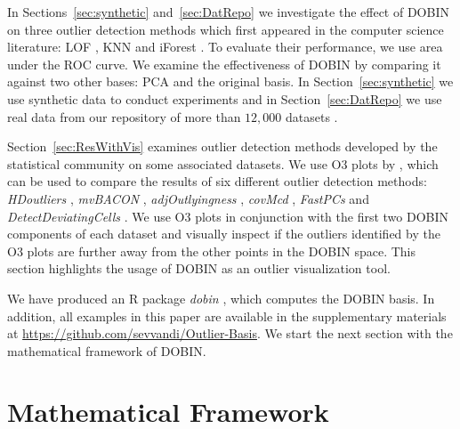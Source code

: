 \documentclass[letter,12pt]{article}
\begin{document}
In Sections~\ref{sec:synthetic} and~\ref{sec:DatRepo} we investigate the effect of DOBIN on three outlier detection methods which first appeared in the computer science literature: LOF \citep{breunig2000lof}, KNN \citep{ramaswamy2000efficient} and iForest \citep{liu2008isolation}. To evaluate their performance, we use area under the ROC curve. We examine the effectiveness of DOBIN by comparing it against two other bases: PCA and the original basis. In Section~\ref{sec:synthetic} we use synthetic data to conduct experiments and in Section~\ref{sec:DatRepo} we use real data from our repository of more than $12,000$ datasets \citep{datasets}.

Section~\ref{sec:ResWithVis} examines outlier detection methods developed by the statistical community on some associated datasets. We use O3 plots by \cite{unwin2019multivariate}, which can be used to compare the results of six different outlier detection methods: \textit{HDoutliers} \citep{wilkinson2017visualizing}, \textit{mvBACON} \citep{billor2000bacon}, \textit{adjOutlyingness} \citep{brys2005robustification}, \textit{covMcd} \citep{rousseeuw1999fast} , \textit{FastPCs} \citep{vakili2014finding} and \textit{DetectDeviatingCells} \citep{rousseeuw2018detecting}. We use O3 plots in conjunction with the first two DOBIN components of each dataset and visually inspect if the outliers identified by the O3 plots are further away from the other points in the DOBIN space. This section highlights the usage of DOBIN as an outlier visualization tool.

We have produced an R package \textit{dobin} \citep{dobin}, which computes the DOBIN basis. In addition, all examples in this paper are available in the supplementary materials at \url{https://github.com/sevvandi/Outlier-Basis}. We start the next section with the mathematical framework of DOBIN. %

\section{Mathematical Framework}\label{sec:MathFrame}
\end{document}
